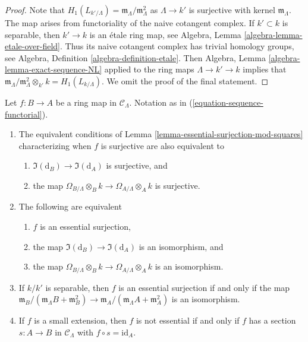 \begin{proof}
Note that $H_1(L_{k'/\Lambda}) = \mathfrak m_\Lambda/\mathfrak m_\Lambda^2$
as $\Lambda \to k'$ is surjective with kernel $\mathfrak m_\Lambda$.
The map arises from functoriality of the naive cotangent complex.
If $k' \subset k$ is separable, then $k' \to k$ is an \'etale ring map, see
Algebra, Lemma \ref{algebra-lemma-etale-over-field}.
Thus its naive cotangent complex has trivial homology groups, see
Algebra, Definition \ref{algebra-definition-etale}.
Then
Algebra, Lemma \ref{algebra-lemma-exact-sequence-NL}
applied to the ring maps $\Lambda \to k' \to k$ implies that
$\mathfrak m_\Lambda/\mathfrak m_\Lambda^2 \otimes_{k'} k = H_1(L_{k/\Lambda})$.
We omit the proof of the final statement.
\end{proof}

\begin{lemma}
\label{lemma-essential-surjection}
Let $f: B \to A$ be a ring map in $\mathcal{C}_\Lambda$.
Notation as in (\ref{equation-sequence-functorial}).
\begin{enumerate}
\item The equivalent conditions of
Lemma \ref{lemma-essential-surjection-mod-squares}
characterizing when $f$ is surjective are also equivalent to
\begin{enumerate}
\item $\Im(\text{d}_B) \to \Im(\text{d}_A)$ is surjective, and
\item the map $\Omega_{B/\Lambda} \otimes_B k \to
\Omega_{A/\Lambda} \otimes_A k$ is surjective.
\end{enumerate}
\item The following are equivalent
\begin{enumerate}
\item $f$ is an essential surjection,
\item the map $\Im(\text{d}_B) \to \Im(\text{d}_A)$ is an
isomorphism, and
\item the map $\Omega_{B/\Lambda} \otimes_B k \to
\Omega_{A/\Lambda} \otimes_A k$ is an isomorphism.
\end{enumerate}
\item If $k/k'$ is separable, then $f$ is an essential surjection if
and only if the map
$\mathfrak m_B/(\mathfrak m_\Lambda B + \mathfrak m_B^2) \to
\mathfrak m_A/(\mathfrak m_\Lambda A + \mathfrak m_A^2)$
is an isomorphism.
\item If $f$ is a small extension, then $f$ is not essential if and only if
$f$ has a section $s: A \to B$ in $\mathcal{C}_\Lambda$
with $f \circ s = \text{id}_A$.
\end{enumerate}
\end{lemma}


